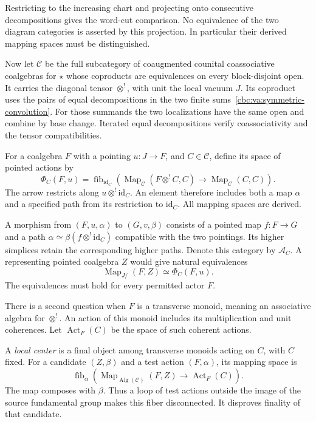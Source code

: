 Restricting to the increasing chart and projecting
onto consecutive decompositions gives the word-cut
comparison. No equivalence of the two diagram
categories is asserted by this projection.
In particular their derived mapping spaces must
be distinguished.

Now let $\mathscr C$ be the full subcategory of
coaugmented counital coassociative coalgebras for
$\star$ whose coproducts are equivalences on every
block-disjoint open. It carries the diagonal tensor
$\otimes^!$, with unit the local vacuum $J$.
Its coproduct uses the pairs of equal decompositions
in the two finite sums~\eqref{cbc:va:symmetric-convolution}.
For those summands the two localizations have the
same open and combine by base change.
Iterated equal decompositions verify coassociativity
and the tensor compatibilities.

For a coalgebra $F$ with a pointing $u:J\to F$, and
$C\in\mathscr C$, define its space of pointed actions by
\begin{equation}\label{cbc:va:pointed-action}
 \Phi_C(F,u)=
 \operatorname{fib}_{\mathrm{id}_C}
 \left(
 \operatorname{Map}_{\mathscr C}(F\otimes^!C,C)
 \longrightarrow\operatorname{Map}_{\mathscr C}(C,C)
 \right).
\end{equation}
The arrow restricts along $u\otimes^!\mathrm{id}_C$.
An element therefore includes both a map $\alpha$ and
a specified path from its restriction to $\mathrm{id}_C$.
All mapping spaces are derived.

A morphism from $(F,u,\alpha)$ to $(G,v,\beta)$ consists
of a pointed map $f:F\to G$ and a path
$\alpha\simeq\beta(f\otimes^!\mathrm{id}_C)$ compatible
with the two pointings. Its higher simplices retain
the corresponding higher paths. Denote this category
by $\mathscr A_C$.
A representing pointed coalgebra $Z$ would give
natural equivalences
\[
 \operatorname{Map}_{J/}(F,Z)\simeq\Phi_C(F,u).
\]
The equivalences must hold for every permitted actor $F$.

There is a second question when $F$ is a transverse
monoid, meaning an associative algebra for $\otimes^!$.
An action of this monoid includes its multiplication
and unit coherences. Let $\operatorname{Act}_F(C)$
be the space of such coherent actions.

A \emph{local center} is a final object among transverse
monoids acting on $C$, with $C$ fixed. For a candidate
$(Z,\beta)$ and a test action $(F,\alpha)$, its mapping
space is
\begin{equation}\label{cbc:va:action-fibre}
 \operatorname{fib}_{\alpha}
 \left(
 \operatorname{Map}_{\operatorname{Alg}(\mathscr C)}(F,Z)
 \longrightarrow\operatorname{Act}_F(C)
 \right).
\end{equation}
The map composes with $\beta$. Thus a loop of test
actions outside the image of the source fundamental
group makes this fiber disconnected. It disproves
finality of that candidate.

